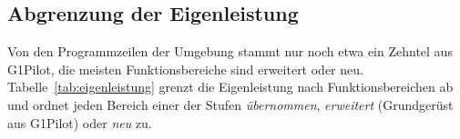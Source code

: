 \subsection{Abgrenzung der Eigenleistung}
\label{sec:eigenleistung}
Von den Programmzeilen der Umgebung stammt nur noch etwa ein Zehntel aus G1Pilot, die meisten Funktionsbereiche sind erweitert oder neu.
Tabelle~\ref{tab:eigenleistung} grenzt die Eigenleistung nach Funktionsbereichen ab und ordnet jeden Bereich einer der Stufen \emph{übernommen}, \emph{erweitert} (Grundgerüst aus G1Pilot) oder \emph{neu} zu.

